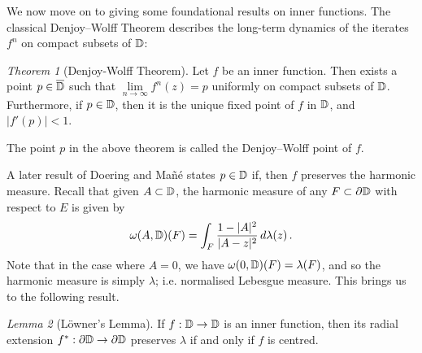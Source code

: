 \documentclass[11pt,reqno]{amsart}
\newcommand{\D}{{\Bbb D}}
\newcommand{\0}{\mathbf{0}}
\newtheorem{theorem}{Theorem}
\newtheorem{lemma}{Lemma}
\theoremstyle{remark}
\numberwithin{equation}{section}
\newtheorem{theorem}{Theorem}[section]
\newtheorem{lemma}[theorem]{Lemma}
\theoremstyle{remark}
\numberwithin{equation}{section}
\begin{document}
We now move on to giving some foundational results on inner functions.
The classical Denjoy–Wolff Theorem describes the long-term dynamics of the iterates $f^n$ on compact subsets of $\D$: 
\begin{theorem}[Denjoy-Wolff Theorem]\label{dw}
    Let $f$ be an inner function. Then exists a point $p \in \overline{\D}$ such that $\lim\limits_{n \to \infty}f^n(z)=p$ uniformly on compact subsets of $\D$. Furthermore, if 
$p \in \D$, then it is the unique fixed point of $f$ in $\D$, and $|f'(p)| < 1$. 
\end{theorem}
The point $p$ in the above theorem is called the Denjoy–Wolff point of $f$.  

A later result of Doering and Ma\~{n}\'{e} \cite[Corollary~1.5]{DM} states
 $p \in \D $ if, then $f$ preserves the harmonic measure. Recall that given $A \subset \D$, the harmonic measure of any $F \subset \partial \D$ with respect to $E$ is given by $$\omega(A,\D)(F)= \int_{F}\frac{1-|A|^2}{|A-z|^2}\,d\lambda(z) \, .$$
Note that in the case where $A=0$, we have $\omega(0,\D)(F)=\lambda(F)$, and so the harmonic measure is simply $\lambda$; i.e. normalised Lebesgue measure. This brings us to the following result.

\begin{lemma}[Löwner's Lemma] \label{low}
If $f : \D \to \D$ is an inner function, then its radial extension $f^*: \partial \D \to \partial \D$ preserves $\lambda$ if and only if $f$ is centred.
\end{lemma}  
\end{document}
